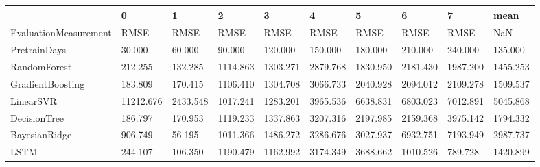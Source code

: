 \begin{tabular}{llllllllll}
\toprule
{} &         0 &        1 &        2 &        3 &        4 &        5 &        6 &        7 &     mean \\
\midrule
EvaluationMeasurement &      RMSE &     RMSE &     RMSE &     RMSE &     RMSE &     RMSE &     RMSE &     RMSE &      NaN \\
PretrainDays          &    30.000 &   60.000 &   90.000 &  120.000 &  150.000 &  180.000 &  210.000 &  240.000 &  135.000 \\
RandomForest          &   212.255 &  132.285 & 1114.863 & 1303.271 & 2879.768 & 1830.950 & 2181.430 & 1987.200 & 1455.253 \\
GradientBoosting      &   183.809 &  170.415 & 1106.410 & 1304.708 & 3066.733 & 2040.928 & 2094.012 & 2109.278 & 1509.537 \\
LinearSVR             & 11212.676 & 2433.548 & 1017.241 & 1283.201 & 3965.536 & 6638.831 & 6803.023 & 7012.891 & 5045.868 \\
DecisionTree          &   186.797 &  170.953 & 1119.233 & 1337.863 & 3207.316 & 2197.985 & 2159.368 & 3975.142 & 1794.332 \\
BayesianRidge         &   906.749 &   56.195 & 1011.366 & 1486.272 & 3286.676 & 3027.937 & 6932.751 & 7193.949 & 2987.737 \\
LSTM                  &   244.107 &  106.350 & 1190.479 & 1162.992 & 3174.349 & 3688.662 & 1010.526 &  789.728 & 1420.899 \\
\bottomrule
\end{tabular}
